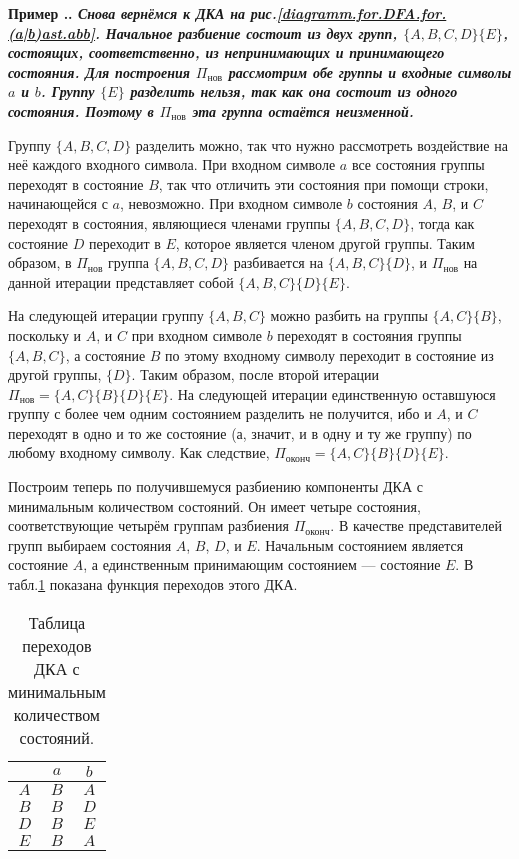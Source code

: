 \documentclass[10pt]{report}
\newcounter{exam}[section]
\renewcommand{\theexam}{\thesection.\arabic{exam}}
\newenvironment{Example}{\par\refstepcounter{exam}\bf Пример \theexam. \sl}{\rm\par}
\begin{document}
\begin{Example}
Снова вернёмся к ДКА на рис.\ref{diagramm.for.DFA.for.(a|b)ast.abb}. Начальное разбиение состоит из двух групп, $\{A,B,C,D\}\{E\}$, состоящих, соответственно, из
непринимающих и принимающего состояния. Для построения $\Pi_{\text{нов}}$ рассмотрим обе группы и входные символы $a$ и $b$. Группу $\{E\}$ разделить нельзя, так как она
состоит из одного состояния. Поэтому в $\Pi_{\text{нов}}$ эта группа остаётся неизменной.

Группу $\{A,B,C,D\}$ разделить можно, так что нужно рассмотреть воздействие на неё каждого входного символа. При входном символе $a$ все состояния группы переходят в
состояние $B$, так что отличить эти состояния при помощи строки, начинающейся с $a$, невозможно. При входном символе $b$ состояния $A$, $B$, и $C$ переходят в состояния,
являющиеся членами группы $\{A,B,C,D\}$, тогда как состояние $D$ переходит в $E$, которое является членом другой группы. Таким образом, в $\Pi_{\text{нов}}$ группа
$\{A,B,C,D\}$ разбивается на $\{A,B,C\}\{D\}$, и $\Pi_{\text{нов}}$ на данной итерации представляет собой $\{A,B,C\}\{D\}\{E\}$.

На следующей итерации группу $\{A,B,C\}$ можно разбить на группы $\{A,C\}\{B\}$, поскольку и $A$, и $C$ при входном символе $b$ переходят в состояния группы $\{A,B,C\}$, а
состояние $B$ по этому входному символу переходит в состояние из другой группы, $\{D\}$. Таким образом, после второй итерации $\Pi_{\text{нов}}=\{A,C\}\{B\}\{D\}\{E\}$. На
следующей итерации единственную оставшуюся группу с более чем одним состоянием разделить не получится, ибо и $A$, и $C$ переходят в одно и то же состояние (а, значит, и в
одну и ту же группу) по любому входному символу. Как следствие, $\Pi_{\text{оконч}}=\{A,C\}\{B\}\{D\}\{E\}$.

Построим теперь по получившемуся разбиению компоненты ДКА с минимальным количеством состояний. Он имеет четыре состояния, соответствующие четырём группам разбиения
$\Pi_{\text{оконч}}$. В качестве представителей групп выбираем состояния $A$, $B$, $D$, и $E$. Начальным состоянием является состояние $A$, а единственным принимающим
состоянием --- состояние $E$. В табл.\ref{Minimal.DFA!table} показана функция переходов этого ДКА.
\begin{table}[!h]
  \centering
  \caption{Таблица переходов ДКА с минимальным количеством состояний.}\label{Minimal.DFA!table}
  \vspace{1mm}
\begin{tabular}{|c|c|c|}  \hline
      & $a$ & $b$ \\  \hline
$A$   & $B$ & $A$ \\  \hline
$B$   & $B$ & $D$ \\  \hline
$D$   & $B$ & $E$ \\  \hline
$E$   & $B$ & $A$ \\  \hline
\end{tabular}
\end{table}
\end{Example}
\end{document}
